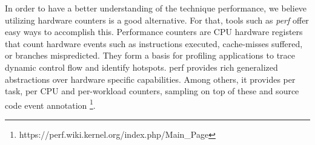 In order to have a better understanding of the technique performance, we believe utilizing hardware counters is a good alternative. For that, tools such as \textit{perf} offer easy ways to accomplish this. Performance counters are CPU hardware registers that count hardware events such as instructions executed, cache-misses suffered, or branches mispredicted. They form a basis for profiling applications to trace dynamic control flow and identify hotspots. perf provides rich generalized abstractions over hardware specific capabilities. Among others, it provides per task, per CPU and per-workload counters, sampling on top of these and source code event annotation \footnote{https://perf.wiki.kernel.org/index.php/Main\_Page}.


%










